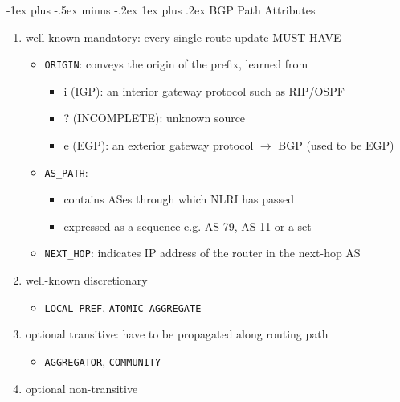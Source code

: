 \documentclass[10pt,landscape]{article}
\makeatletter
\newcommand{\subsubsubsection}{\@startsection{subsubsection}{3}{0mm}%
                                {-1ex plus -.5ex minus -.2ex}%
                                {1ex plus .2ex}%
                                {\normalfont\scriptsize\bfseries}}
\makeatother
\begin{document}
\begin{multicols*}{3}
\subsubsubsection{BGP Path Attributes}
\begin{enumerate}[topsep=0pt,noitemsep,wide=0pt, leftmargin=\dimexpr\labelwidth + 2\labelsep\relax]
  \item well-known mandatory: every single route update MUST HAVE
  \begin{itemize}[topsep=0pt,noitemsep,wide=0pt, leftmargin=\dimexpr{} + 2\relax]
    \item \verb|ORIGIN|: conveys the origin of the prefix, learned from
    \begin{itemize}[topsep=0pt,noitemsep,wide=0pt, leftmargin=\dimexpr{} + 2\relax]
      \item i (IGP): an interior gateway protocol such as RIP/OSPF
      \item ? (INCOMPLETE): unknown source
      \item e (EGP): an exterior gateway protocol $\rightarrow$ BGP (used to be EGP)
    \end{itemize}
    \item \verb|AS_PATH|: 
    \begin{itemize}[topsep=0pt,noitemsep,wide=0pt, leftmargin=\dimexpr{} + 2\relax]
      \item contains ASes through which NLRI has passed
      \item expressed as a sequence e.g. AS 79, AS 11 or a set
    \end{itemize}
    \item \verb|NEXT_HOP|: indicates IP address of the router in the next-hop AS
  \end{itemize}
  \item well-known discretionary
  \begin{itemize}[topsep=0pt,noitemsep,wide=0pt, leftmargin=\dimexpr{} + 2\relax]
    \item \verb|LOCAL_PREF|, \verb|ATOMIC_AGGREGATE|
  \end{itemize}
  \item optional transitive: have to be propagated along routing path
  \begin{itemize}[topsep=0pt,noitemsep,wide=0pt, leftmargin=\dimexpr{} + 2\relax]
    \item \verb|AGGREGATOR|, \verb|COMMUNITY|
  \end{itemize}
  \item optional non-transitive
  \begin{itemize}[topsep=0pt,noitemsep,wide=0pt, leftmargin=\dimexpr{} + 2\relax]

\end{itemize}
\end{enumerate}
\end{multicols*}
\end{document}
